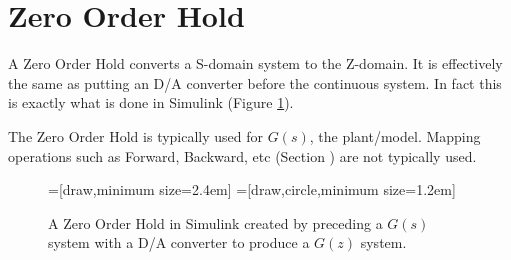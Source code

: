 \documentclass{article}
\newcommand{\sincludepdf}[2][]{
	
}
\begin{document}
\sincludepdf[pages={13},
			pagecommand=\subsection*{Example 3}
		]{scan/11211301.pdf}

\clearpage
\section{Zero Order Hold}
\label{sec:zoh}

A Zero Order Hold converts a S-domain system to the Z-domain.
It is effectively the same as putting an D/A converter before
the continuous system.
In fact this is exactly what is done in Simulink (Figure \ref{fig:simulinkzoh}).

The Zero Order Hold is typically used for $G(s)$, the plant/model.
Mapping operations such as Forward, Backward, etc
(Section \label{sec:mapping}) are not typically used.

\begin{figure}
\begin{center}
=[draw,minimum size=2.4em]
=[draw,circle,minimum size=1.2em]
\end{center}

\caption{A Zero Order Hold in Simulink created by preceding
a $G(s)$ system with a D/A converter to produce a $G(z)$ system.}
\label{fig:simulinkzoh}
\end{figure}
\end{document}
